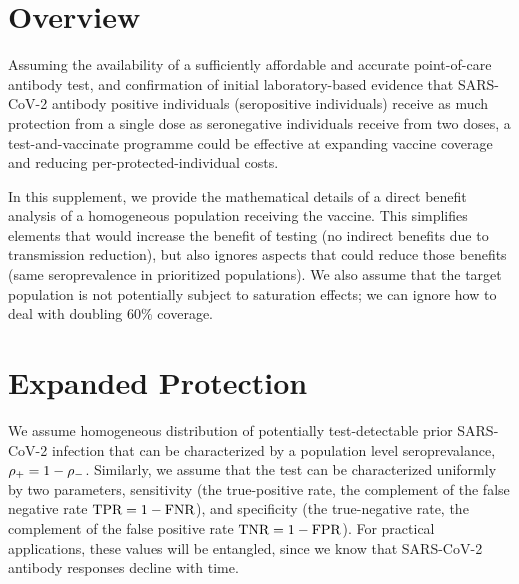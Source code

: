 \documentclass{article}
\begin{document}


\title{\partitle}

\maketitle




\linenumbers

\section{Overview}

Assuming the availability of a sufficiently affordable and accurate point-of-care antibody test, and confirmation of initial laboratory-based evidence that SARS-CoV-2 antibody positive individuals (\ie* seropositive individuals) receive as much protection from a single dose as seronegative individuals receive from two doses, a test-and-vaccinate programme could be effective at expanding vaccine coverage and reducing per-protected-individual costs.

In this supplement, we provide the mathematical details of a direct benefit analysis of a homogeneous population receiving the vaccine. This simplifies elements that would increase the benefit of testing (\eg* no indirect benefits due to transmission reduction), but also ignores aspects that could reduce those benefits (\eg* same seroprevalence in prioritized populations). We also assume that the target population is not potentially subject to saturation effects; \eg* we can ignore how to deal with doubling 60\% coverage.

\section{Expanded Protection}

We assume homogeneous distribution of potentially test-detectable prior SARS-CoV-2 infection that can be characterized by a population level seroprevalance, $\rho_{{+}} = 1 - \rho_{{-}}$. Similarly, we assume that the test can be characterized uniformly by two parameters, sensitivity (the true-positive rate, the complement of the false negative rate $\textrm{TPR} = 1 - \textrm{FNR}$), and specificity (the true-negative rate, the complement of the false positive rate $\textrm{TNR} = 1 - \textrm{FPR}$). For practical applications, these values will be entangled, since we know that \eg* SARS-CoV-2 antibody responses decline with time.
\end{document}
